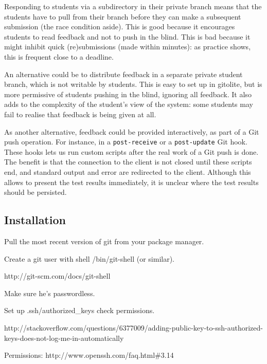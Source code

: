 Responding to students via a subdirectory in their private branch means that
the students have to pull from their branch before they can make a subsequent
submission (the race condition aside). This is good because it encourages
students to read feedback and not to push in the blind. This is bad because it
might inhibit quick (re)submissions (made within minutes): as practice shows,
this is frequent close to a deadline.

An alternative could be to distribute feedback in a separate private student
branch, which is not writable by students. This is easy to set up in gitolite,
but is more permissive of students pushing in the blind, ignoring all feedback.
It also adds to the complexity of the student's view of the system: some
students may fail to realise that feedback is being given at all.

As another alternative, feedback could be provided interactively, as part of a
Git push operation. For instance, in a \texttt{post-receive} or a
\texttt{post-update} Git hook. These hooks lets us run custom scripts after the
real work of a Git push is done. The benefit is that the connection to the
client is not closed until these scripts end, and standard output and error are
redirected to the client\cite{man-5-githooks}. Although this allows to present
the test results immediately, it is unclear where the test results should be
persisted.

\subsection{Installation}

Pull the most recent version of git from your package manager.

Create a git user with shell /bin/git-shell (or similar).

http://git-scm.com/docs/git-shell

Make sure he's passwordless.

Set up .ssh/authorized\_keys check permissions.

http://stackoverflow.com/questions/6377009/adding-public-key-to-ssh-authorized-keys-does-not-log-me-in-automatically

Permissions: http://www.openssh.com/faq.html\#3.14


